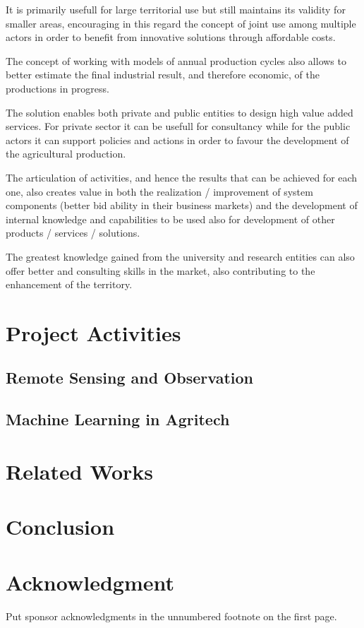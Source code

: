 \documentclass[conference]{IEEEtran}
\begin{document}
It is primarily usefull for large territorial use but still maintains its validity for smaller areas, encouraging in this regard the concept of joint use among multiple actors in order to benefit from innovative solutions through affordable costs.


The concept of working with models of annual production cycles also allows to better estimate the final industrial result, and therefore economic, of the productions in progress.


The solution enables both private and public entities to design high value added services. For private sector it can be usefull for consultancy while for the public actors it can support policies and actions in order to favour the development of the agricultural production.


The articulation of activities, and hence the results that can be achieved for each one, also creates value in both the realization / improvement of system components (better bid ability in their business markets) and the development of internal knowledge and capabilities to be used also for development of other products / services / solutions.


The greatest knowledge gained from the university and research entities can also offer better and consulting skills in the market, also contributing to the enhancement of the territory.

\lipsum[2-3]

\section{Project Activities} 

\subsection{Remote Sensing and Observation}

\lipsum[2-10] %

\subsection{Machine Learning in Agritech}

\lipsum[2-10]  %

\section{Related Works}
\lipsum[2-8] 

\section{Conclusion} 
\lipsum[1-3]

\section*{Acknowledgment}
 Put sponsor 
acknowledgments in the unnumbered footnote on the first page.

\printbibliography
\end{document}
